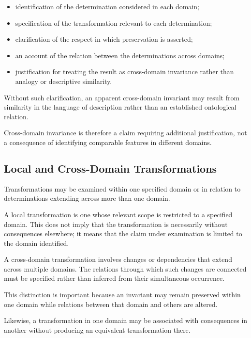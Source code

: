 \begin{itemize}
    \item identification of the determination
          considered in each domain;
    \item specification of the transformation
          relevant to each determination;
    \item clarification of the respect in which
          preservation is asserted;
    \item an account of the relation between
          the determinations across domains;
    \item justification for treating the result
          as cross-domain invariance rather than
          analogy or descriptive similarity.
\end{itemize}

Without such clarification, an apparent
cross-domain invariant may result from
similarity in the language of description
rather than an established ontological relation.

Cross-domain invariance is therefore a
claim requiring additional justification,
not a consequence of identifying comparable
features in different domains.

\subsection{Local and Cross-Domain Transformations}

Transformations may be examined within one
specified domain or in relation to determinations
extending across more than one domain.

A local transformation is one whose relevant
scope is restricted to a specified domain.
This does not imply that the transformation
is necessarily without consequences elsewhere;
it means that the claim under examination
is limited to the domain identified.

A cross-domain transformation involves
changes or dependencies that extend across
multiple domains. The relations through
which such changes are connected must
be specified rather than inferred from
their simultaneous occurrence.

This distinction is important because an
invariant may remain preserved within
one domain while relations between that
domain and others are altered.

Likewise, a transformation in one domain
may be associated with consequences in
another without producing an equivalent
transformation there.

